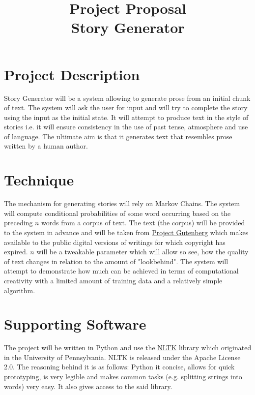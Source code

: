 \documentclass[a4paper, 12pt, notitlepage]{article}
\date{} %
\author{}
\title{Project Proposal \\ Story Generator}
\begin{document}
\maketitle

\vspace{-1.5cm}

\section*{Project Description}

Story Generator will be a system allowing to generate prose from an initial
chunk of text. The system will ask the user for input and will try to complete
the story using the input as the initial state.  It will attempt to produce
text in the style of stories i.e. it will ensure consistency in
the use of past tense, atmosphere and use of language. The ultimate aim is
that it generates text that resembles prose written by a human author.

\section*{Technique}

The mechanism for generating stories will rely on Markov Chains. The system
will compute conditional probabilities of some word occurring
based on the preceding $n$ words from a corpus of text. The text (the
corpus) will be provided to the system in advance and will be taken from
\href{https://www.gutenberg.org/}{Project Gutenberg} which makes available to
the public digital versions of writings for which copyright has expired. $n$
will be a tweakable parameter which will allow so see, how the quality of text
changes in relation to the amount of "lookbehind". The system will attempt
to demonstrate how much can be achieved in terms of computational creativity
with a limited amount of training data and a relatively simple algorithm.

\section*{Supporting Software}

The project will be written in Python and use the
\href{http://www.nltk.org/}{NLTK} library which originated in the University
of Pennsylvania. NLTK is released under the Apache License 2.0.
The reasoning behind it is as follows: Python it concise, allows for quick
prototyping, is very legible and makes common tasks (e.g. splitting strings
into words) very easy. It also gives access to the said library.
\end{document}
